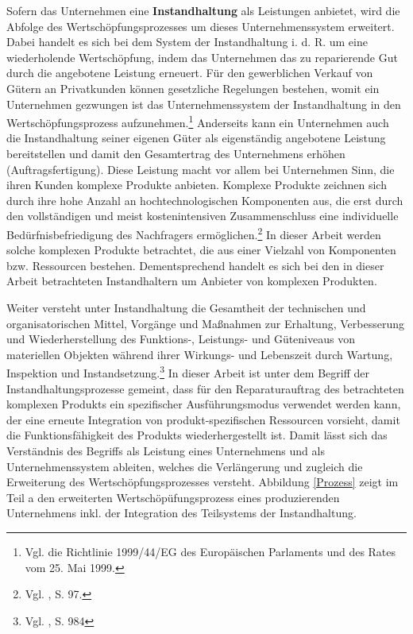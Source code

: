 Sofern das Unternehmen eine \textbf{Instandhaltung} als Leistungen anbietet, wird die Abfolge des Wertschöpfungsprozesses um dieses Unternehmenssystem erweitert. Dabei handelt es sich bei dem System der Instandhaltung i. d. R. um eine wiederholende Wertschöpfung, indem das Unternehmen das zu reparierende Gut durch die angebotene Leistung erneuert. Für den gewerblichen Verkauf von Gütern an Privatkunden können gesetzliche Regelungen bestehen, womit ein Unternehmen gezwungen ist das Unternehmenssystem der Instandhaltung in den Wertschöpfungsprozess aufzunehmen.\footnote{Vgl. die Richtlinie 1999/44/EG des Europäischen Parlaments und des Rates vom 25. Mai 1999.} Anderseits kann ein Unternehmen auch die Instandhaltung seiner eigenen Güter als eigenständig angebotene Leistung bereitstellen und damit den Gesamtertrag des Unternehmens erhöhen (Auftragsfertigung). Diese Leistung macht vor allem bei Unternehmen Sinn, die ihren Kunden komplexe Produkte anbieten. Komplexe Produkte zeichnen sich durch ihre hohe Anzahl an hochtechnologischen Komponenten aus, die erst durch den vollständigen und meist kostenintensiven Zusammenschluss eine individuelle Bedürfnisbefriedigung des Nachfragers ermöglichen.\footnote{Vgl. \cite{komplexe2009Schmidt}, S. 97.} In dieser Arbeit werden solche komplexen Produkte betrachtet, die aus einer Vielzahl von Komponenten bzw. Ressourcen bestehen. Dementsprechend handelt es sich bei den in dieser Arbeit betrachteten Instandhaltern um Anbieter von komplexen Produkten. 

Weiter versteht \citeauthor{helbing2010instandhaltung} unter Instandhaltung die \glqq Gesamtheit der technischen und organisatorischen Mittel, Vorgänge und Maßnahmen zur Erhaltung, Verbesserung und Wiederherstellung des Funktions-, Leistungs- und Güteniveaus von materiellen Objekten während ihrer Wirkungs- und Lebenszeit durch Wartung, Inspektion und Instandsetzung.\grqq\footnote{Vgl. \citeauthor{helbing2010instandhaltung}, S. 984} In dieser Arbeit ist unter dem Begriff der Instandhaltungsprozesse gemeint, dass für den Reparaturauftrag des betrachteten komplexen Produkts ein spezifischer Ausführungsmodus verwendet werden kann, der eine erneute Integration von produkt-spezifischen Ressourcen vorsieht, damit die Funktionsfähigkeit des Produkts wiederhergestellt ist. Damit lässt sich das Verständnis des Begriffs als Leistung eines Unternehmens und als Unternehmenssystem ableiten, welches die Verlängerung und zugleich die Erweiterung des Wertschöpfungsprozesses versteht. Abbildung \ref{Prozess} zeigt im Teil a den erweiterten Wertschöpüfungsprozess eines produzierenden Unternehmens inkl. der Integration des Teilsystems der Instandhaltung.

